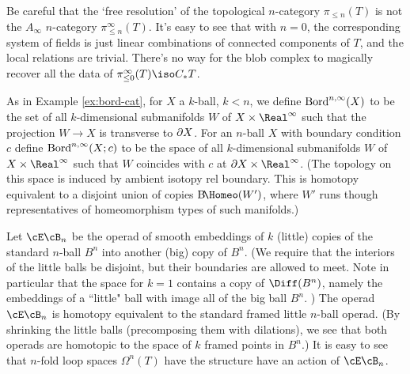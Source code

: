 Be careful that the `free resolution' of the topological $n$-category $\pi_{\leq n}(T)$ is not the $A_\infty$ $n$-category $\pi^\infty_{\leq n}(T)$.
It's easy to see that with $n=0$, the corresponding system of fields is just 
linear combinations of connected components of $T$, and the local relations are trivial.
There's no way for the blob complex to magically recover all the data of $\pi^\infty_{\leq 0}(T) \iso C_* T$.

\begin{example}
\rm
\label{ex:bordism-category-ainf}
As in Example \ref{ex:bord-cat}, for $X$ a $k$-ball, $k<n$, we define $\operatorname{Bord}^{n,\infty}(X)$
to be the set of all $k$-dimensional
submanifolds $W$ of $X\times \Real^\infty$ such that the projection $W \to X$ is transverse
to $\partial X$.
For an $n$-ball $X$ with boundary condition $c$ 
define $\operatorname{Bord}^{n,\infty}(X; c)$ to be the space of all $k$-dimensional
submanifolds $W$ of $X\times \Real^\infty$ such that 
$W$ coincides with $c$ at $\bd X \times \Real^\infty$.
(The topology on this space is induced by ambient isotopy rel boundary.
This is homotopy equivalent to a disjoint union of copies $\mathrm{B}\!\Homeo(W')$, where
$W'$ runs though representatives of homeomorphism types of such manifolds.)
\end{example}



Let $\cE\cB_n$ be the operad of smooth embeddings of $k$ (little)
copies of the standard $n$-ball $B^n$ into another (big) copy of $B^n$.
(We require that the interiors of the little balls be disjoint, but their 
boundaries are allowed to meet.
Note in particular that the space for $k=1$ contains a copy of $\Diff(B^n)$, namely
the embeddings of a ``little" ball with image all of the big ball $B^n$.
)
The operad $\cE\cB_n$ is homotopy equivalent to the standard framed little $n$-ball operad.
(By shrinking the little balls (precomposing them with dilations), 
we see that both operads are homotopic to the space of $k$ framed points
in $B^n$.)
It is easy to see that $n$-fold loop spaces $\Omega^n(T)$ have the structure have
an action of $\cE\cB_n$.

